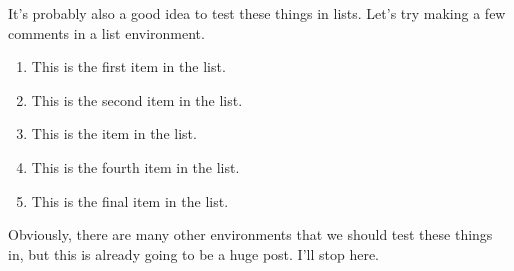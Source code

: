 \documentclass[draft]{article}
\begin{document}
It's probably also a good idea to test these things in lists.  Let's try making a few comments in a list environment.

\begin{enumerate}
	\item This is the first item in the list.
	\item This is the second item in the list.
	\item This is the  item in the list.
	\item This is the fourth item in the list.
	\item This is the final item in the list.
\end{enumerate}

Obviously, there are many other environments that we should test these things in, but this is already going to be a huge post.  I'll stop here.
\end{document}
